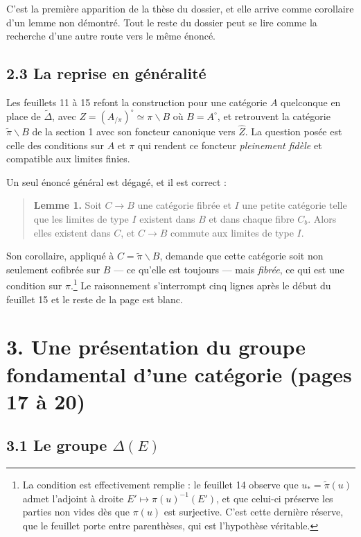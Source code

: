 \documentclass[11pt,a4paper]{article}
\begin{document}
C'est la première apparition de la thèse du dossier, et elle arrive comme
corollaire d'un lemme non démontré. Tout le reste du dossier peut se lire
comme la recherche d'une autre route vers le même énoncé.

\subsection*{2.3 La reprise en généralité}

Les feuillets 11 à 15 refont la construction pour une catégorie $A$
quelconque en place de $\widetilde{\Delta}$, avec
$Z = (A_{/\pi})^{\circ} \simeq \pi\backslash B$ où $B = A^{\circ}$, et
retrouvent la catégorie $\widetilde{\pi}\backslash B$ de la section 1 avec son
foncteur canonique vers $\widehat{Z}$. La question posée est celle des
conditions sur $A$ et $\pi$ qui rendent ce foncteur \emph{pleinement fidèle}
et compatible aux limites finies.

Un seul énoncé général est dégagé, et il est correct :

\begin{quote}
\textbf{Lemme 1.} Soit $C \to B$ une catégorie fibrée et $I$ une petite
catégorie telle que les limites de type $I$ existent dans $B$ et dans chaque
fibre $C_{b}$. Alors elles existent dans $C$, et $C \to B$ commute aux limites
de type $I$.
\end{quote}

Son corollaire, appliqué à $C = \widetilde{\pi}\backslash B$, demande que
cette catégorie soit non seulement cofibrée sur $B$ — ce qu'elle est
toujours — mais \emph{fibrée}, ce qui est une condition sur $\pi$.\footnote{La
condition est effectivement remplie : le feuillet 14 observe que
$u_{*} = \widetilde{\pi}(u)$ admet l'adjoint à droite
$E' \mapsto \pi(u)^{-1}(E')$, et que celui-ci préserve les parties non vides
dès que $\pi(u)$ est surjective. C'est cette dernière réserve, que le feuillet
porte entre parenthèses, qui est l'hypothèse véritable.} Le raisonnement
s'interrompt cinq lignes après le début du feuillet 15 et le reste de la
page est blanc.

\section*{3. Une présentation du groupe fondamental d'une catégorie (pages 17 à 20)}

\subsection*{3.1 Le groupe $\Delta(E)$}
\end{document}
